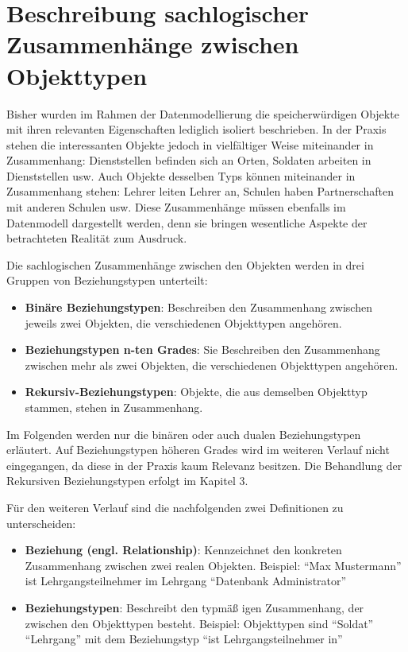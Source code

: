 \chapter{Beschreibung sachlogischer Zusammenhänge zwischen Objekttypen}
  \chaptertoc{}
  \cleardoubleevenpage
  
  Bisher wurden im Rahmen der Datenmodellierung die speicherwürdigen Objekte mit ihren relevanten Eigenschaften lediglich isoliert beschrieben. In der Praxis stehen die interessanten Objekte jedoch in vielfältiger Weise miteinander in Zusammenhang: Dienststellen befinden sich an Orten, Soldaten arbeiten in Dienststellen usw. Auch Objekte desselben Typs können miteinander in Zusammenhang stehen: Lehrer leiten Lehrer an, Schulen haben Partnerschaften mit anderen Schulen usw. Diese Zusammenhänge müssen ebenfalls im Datenmodell dargestellt werden, denn sie bringen wesentliche Aspekte der betrachteten Realität zum Ausdruck.

    Die sachlogischen Zusammenhänge zwischen den Objekten werden in drei Gruppen von Beziehungstypen unterteilt:
    \begin{itemize}
      \item \textbf{Binäre Beziehungstypen}: Beschreiben den Zusammenhang zwischen jeweils zwei Objekten, die verschiedenen Objekttypen angehören.
      \item \textbf{Beziehungstypen n-ten Grades}: Sie Beschreiben den Zusammenhang zwischen mehr als zwei Objekten, die verschiedenen Objekttypen angehören.
      \item \textbf{Rekursiv-Beziehungstypen}: Objekte, die aus demselben Objekttyp stammen, stehen in Zusammenhang.
    \end{itemize}

    Im Folgenden werden nur die binären oder auch dualen Beziehungstypen erläutert. Auf Beziehungstypen höheren Grades wird im
    weiteren Verlauf nicht eingegangen, da diese in der Praxis kaum Relevanz besitzen. Die Behandlung der Rekursiven
    Beziehungstypen erfolgt im Kapitel 3.

      Für den weiteren Verlauf sind die nachfolgenden zwei Definitionen zu unterscheiden:
      \begin{itemize}
        \item \textbf{Beziehung (engl. Relationship)}: Kennzeichnet den konkreten Zusammenhang zwischen zwei realen Objekten. Beispiel: \enquote{Max Mustermann} ist Lehrgangsteilnehmer im Lehrgang \enquote{Datenbank Administrator}
        \item \textbf{Beziehungstypen}: Beschreibt den typmäß igen Zusammenhang, der zwischen den Objekttypen besteht. Beispiel: Objekttypen sind \enquote{Soldat} \enquote{Lehrgang} mit dem Beziehungstyp \enquote{ist Lehrgangsteilnehmer in}
      \end{itemize}

